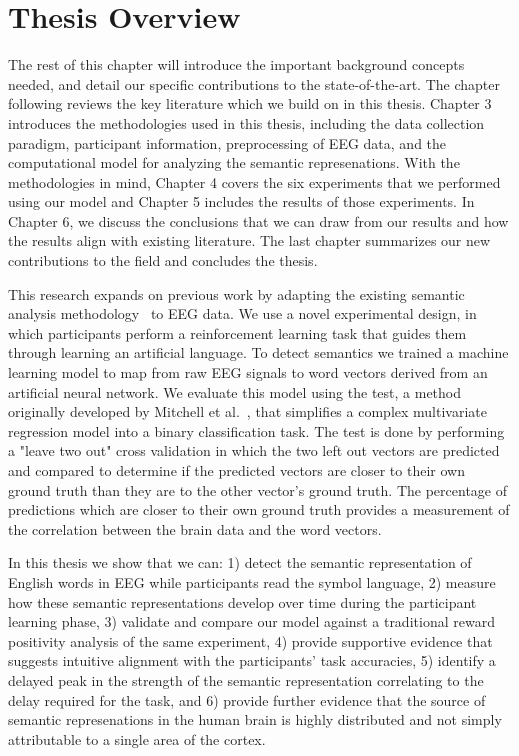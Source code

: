 \section{Thesis Overview}

The rest of this chapter will introduce the important background concepts 
needed, and detail our specific contributions to the state-of-the-art. The 
chapter following reviews the key literature which we build on in this thesis.  
Chapter 3 introduces the methodologies used in this thesis, including the data 
collection paradigm, participant information, preprocessing of EEG data, and 
the computational model for analyzing the semantic represenations. With the 
methodologies in mind, Chapter 4 covers the six experiments that we performed 
using our model and Chapter 5 includes the results of those experiments. In 
Chapter 6, we discuss the conclusions that we can draw from our results and how 
the results align with existing literature. The last chapter summarizes our new 
contributions to the field and concludes the thesis.

This research expands on previous work by adapting the existing semantic 
analysis methodology~\cite{Mitchell2008,Sudre2012} to EEG data.  We use a novel 
experimental design, in which participants perform a reinforcement learning 
task that guides them through learning an artificial language. To detect 
semantics we trained a machine learning model to map from raw EEG signals to 
word vectors derived from an artificial neural network. We evaluate this model 
using the \tvt test, a method originally developed by Mitchell et 
al.~\cite{Mitchell2008}, that simplifies a complex multivariate regression 
model into a binary classification task. The \tvt test is done by performing a 
"leave two out" cross validation in which the two left out vectors are 
predicted and compared to determine if the predicted vectors are closer to 
their own ground truth than they are to the other vector's ground truth. The 
percentage of predictions which are closer to their own ground truth provides a 
measurement of the correlation between the brain data and the word vectors.

In this thesis we show that we can: 1) detect the semantic representation of 
English words in EEG while participants read the symbol language, 2) measure 
how these semantic representations develop over time during the participant 
learning phase, 3) validate and compare our model against a traditional reward 
positivity analysis of the same experiment, 4) provide supportive evidence that 
suggests intuitive alignment with the participants' task accuracies, 5) 
identify a delayed peak in the strength of the semantic representation 
correlating to the delay required for the task, and 6) provide further evidence 
that the source of semantic represenations in the human brain is highly 
distributed and not simply attributable to a single area of the cortex.

